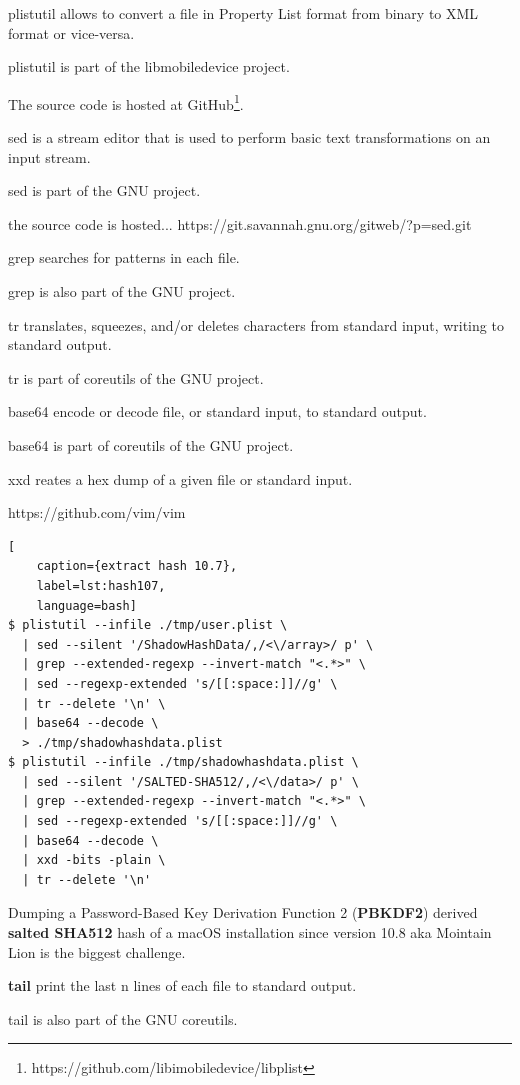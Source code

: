plistutil allows to convert a file in Property List format from binary to XML format or vice-versa.

plistutil is part of the libmobiledevice project.

The source code is hosted at GitHub\footnote{https://github.com/libimobiledevice/libplist}.

sed is a stream editor that is used to perform basic text transformations on an input stream.

sed is part of the GNU project.

the source code is hosted... https://git.savannah.gnu.org/gitweb/?p=sed.git

grep searches for patterns in each file.

grep is also part of the GNU project.

tr translates, squeezes, and/or deletes characters from standard input, writing to standard output.

tr is part of coreutils of the GNU project.

base64 encode or decode file, or standard input, to standard output.

base64 is part of coreutils of the GNU project.

xxd reates a hex dump of a given file or standard input.

https://github.com/vim/vim

\begin{lstlisting}[
    caption={extract hash 10.7},
    label=lst:hash107,
    language=bash]
$ plistutil --infile ./tmp/user.plist \
  | sed --silent '/ShadowHashData/,/<\/array>/ p' \
  | grep --extended-regexp --invert-match "<.*>" \
  | sed --regexp-extended 's/[[:space:]]//g' \
  | tr --delete '\n' \
  | base64 --decode \
  > ./tmp/shadowhashdata.plist
$ plistutil --infile ./tmp/shadowhashdata.plist \
  | sed --silent '/SALTED-SHA512/,/<\/data>/ p' \
  | grep --extended-regexp --invert-match "<.*>" \
  | sed --regexp-extended 's/[[:space:]]//g' \
  | base64 --decode \
  | xxd -bits -plain \
  | tr --delete '\n'
\end{lstlisting}

Dumping a Password-Based Key Derivation Function 2 (\textbf{PBKDF2}) derived \textbf{salted SHA512} hash of a macOS installation since version 10.8 aka Mointain Lion is the biggest challenge.

\textbf{tail} print the last n lines of each file to standard output.

tail is also part of the GNU coreutils.

